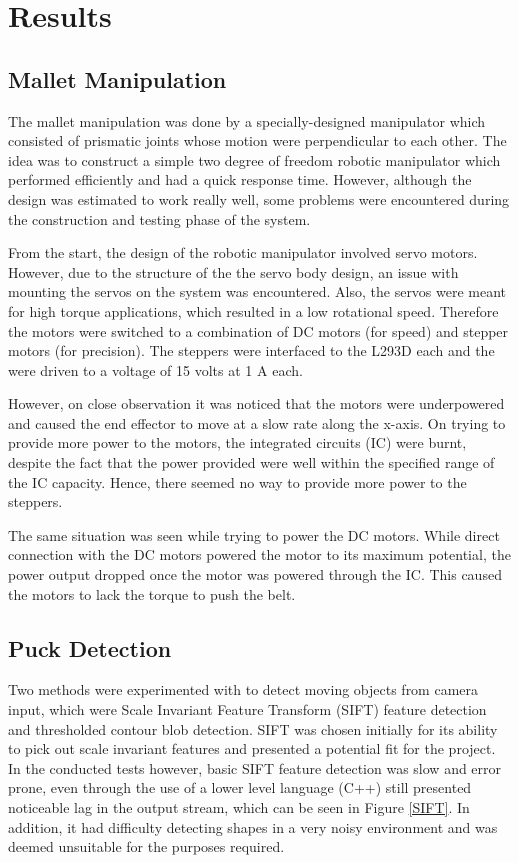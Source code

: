 \documentclass[letterpaper, 12 pt, conference]{ieeeconf}
\begin{document}
\section{Results}
\label{results}
\subsection{Mallet Manipulation}
\label{results-malletmanipulation}
The mallet manipulation was done by a specially-designed manipulator which consisted of prismatic joints whose motion were perpendicular to each other. The idea was to construct a simple two degree of freedom robotic manipulator which performed efficiently and had a quick response time. However, although the design was estimated to work really well, some problems were encountered during the construction and testing phase of the system. 

From the start, the design of the robotic manipulator involved servo motors. However, due to the structure of the the servo body design, an issue with mounting the servos on the system was encountered. Also, the servos were meant for high torque applications, which resulted in a low rotational speed. Therefore the motors were switched to a combination of DC motors (for speed) and stepper motors (for precision). The steppers were interfaced to the L293D each and the were driven to a voltage of 15 volts at 1 A each.

However, on close observation it was noticed that the motors were underpowered and caused the end effector to move at a slow rate along the x-axis. On trying to provide more power to the motors, the integrated circuits (IC) were burnt, despite the fact that the power provided were well within the specified range of the IC capacity. Hence, there seemed no way to provide more power to the steppers.

The same situation was seen while trying to power the DC motors. While direct connection with the DC motors powered the motor to its maximum potential, the power output dropped once the motor was powered through the IC. This caused the motors to lack the torque to push the belt.

\subsection{Puck Detection}
\label{results-puckdetection}
Two methods were experimented with to detect moving objects from camera input, which were Scale Invariant Feature Transform (SIFT) feature detection and thresholded contour blob detection. SIFT was chosen initially for its ability to pick out scale invariant features and presented a potential fit for the project. In the conducted tests however, basic SIFT feature detection was slow and error prone, even through the use of a lower level language (C++) still presented noticeable lag in the output stream, which can be seen in Figure \ref{SIFT}. In addition, it had difficulty detecting shapes in a very noisy environment and was deemed unsuitable for the purposes required. 
\end{document}
